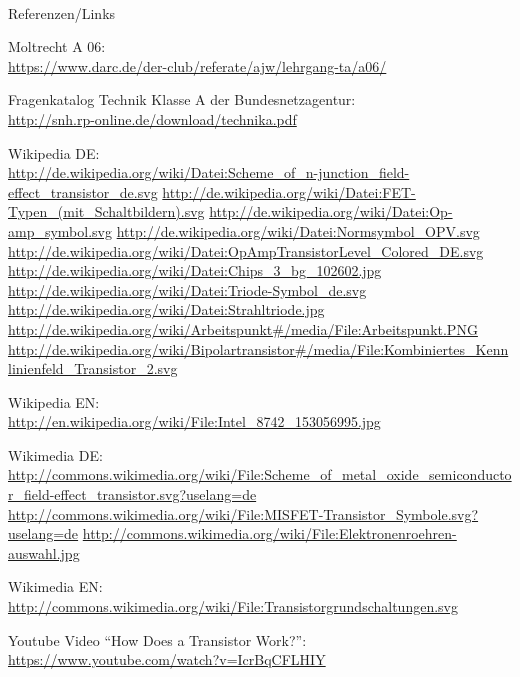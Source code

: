 \renewcommand{\refname}{Referenzen}

\hypertarget{refs}{}
\textcolor{white}{} \\ %
\Large Referenzen/Links
\footnotesize

\begin{thebibliography}{}
       Moltrecht A 06: \\
                    \url{https://www.darc.de/der-club/referate/ajw/lehrgang-ta/a06/}
                    
		Fragenkatalog Technik Klasse A der Bundesnetzagentur:\\
		\url{http://snh.rp-online.de/download/technika.pdf}                    
                    
        Wikipedia DE: \\
    	\url{http://de.wikipedia.org/wiki/Datei:Scheme_of_n-junction_field-effect_transistor_de.svg}
    	\url{http://de.wikipedia.org/wiki/Datei:FET-Typen_(mit_Schaltbildern).svg}
        \url{http://de.wikipedia.org/wiki/Datei:Op-amp_symbol.svg}
        \url{http://de.wikipedia.org/wiki/Datei:Normsymbol_OPV.svg}      
        \url{http://de.wikipedia.org/wiki/Datei:OpAmpTransistorLevel_Colored_DE.svg}  
        \url{http://de.wikipedia.org/wiki/Datei:Chips_3_bg_102602.jpg}
        \url{http://de.wikipedia.org/wiki/Datei:Triode-Symbol_de.svg}
        \url{http://de.wikipedia.org/wiki/Datei:Strahltriode.jpg}
	\url{http://de.wikipedia.org/wiki/Arbeitspunkt#/media/File:Arbeitspunkt.PNG}
	\url{http://de.wikipedia.org/wiki/Bipolartransistor#/media/File:Kombiniertes_Kennlinienfeld_Transistor_2.svg}
                    
    	Wikipedia EN:\\
    	\url{http://en.wikipedia.org/wiki/File:Intel_8742_153056995.jpg}
    	
    	Wikimedia DE:\\
    	\url{http://commons.wikimedia.org/wiki/File:Scheme_of_metal_oxide_semiconductor_field-effect_transistor.svg?uselang=de}
    	\url{http://commons.wikimedia.org/wiki/File:MISFET-Transistor_Symbole.svg?uselang=de}
    	\url{http://commons.wikimedia.org/wiki/File:Elektronenroehren-auswahl.jpg}
    	
     Wikimedia EN:\\
    	\url{http://commons.wikimedia.org/wiki/File:Transistorgrundschaltungen.svg}\
    				
      Youtube Video “How Does a Transistor Work?”:
    \url{https://www.youtube.com/watch?v=IcrBqCFLHIY}
\end{thebibliography} 


